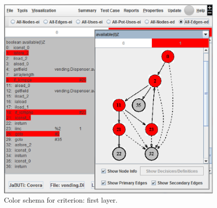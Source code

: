 
\begin{figure}[!ht]
\begin{center}
\includegraphics[height=0.40\textheight]{fig/sec-edges-layer1.eps}
\caption{\label{fig:sec-edges-1} Color schema for
 criterion: first layer.}
\end{center}
\end{figure}
